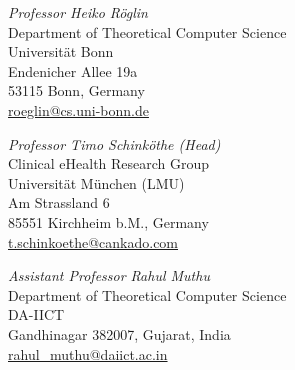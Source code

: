 \documentclass{res}
\begin{document}
\begin{resume}
\begin{minipage}[ht]{0.67\textwidth}
{\sl Professor Heiko R{\"o}glin} \\ Department of Theoretical Computer Science \\ Universit{\"a}t Bonn \\ Endenicher Allee 19a \\ 53115 Bonn, Germany \\ \href{mailto:roeglin@cs.uni-bonn.de}{roeglin@cs.uni-bonn.de}
\end{minipage}
\begin{minipage}[ht]{0.67\textwidth}
{\sl Professor Timo Schink{\"o}the (Head)} \\ Clinical eHealth Research Group \\ Universit{\"a}t M{\"u}nchen (LMU) \\ Am Strassland 6 \\ 85551 Kirchheim b.M., Germany \\ \href{mailto:t.schinkoethe@cankado.com}{t.schinkoethe@cankado.com}
\end{minipage}

\vspace{5pt}
\begin{minipage}[ht]{0.67\textwidth}
{\sl Assistant Professor Rahul Muthu} \\
Department of Theoretical Computer Science \\
DA-IICT \\
Gandhinagar 382007, Gujarat, India \\
\href{mailto:rahul\_muthu@daiict.ac.in}{rahul\_muthu@daiict.ac.in}

\end{minipage} 
\end{resume} 
\end{document}

